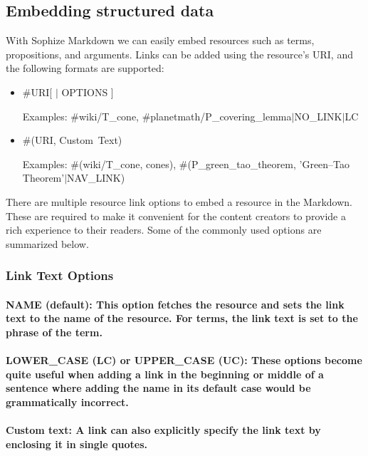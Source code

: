 \documentclass[a4paper]{article}
\begin{document}
\subsection{Embedding structured data}

With Sophize Markdown we can easily embed resources such as terms, propositions, and arguments. Links can be added using the resource's URI, and the following formats are supported:


\begin{itemize}

	\item \#URI[ $\vert$ OPTIONS ]

	Examples: \#wiki/T\_cone, \#planetmath/P\_covering\_lemma$\vert$NO\_LINK$\vert$LC

	\item \#(URI, \textquotesingle Custom\ Text)

	Examples: \#(wiki/T\_cone, \textquotesingle cones\textquotesingle), \#(P\_green\_tao\_theorem, 'Green–Tao Theorem'$\vert$NAV\_LINK)

\end{itemize}

There are multiple resource link options to embed a resource in the Markdown. These are required to make it convenient for the content creators to provide a rich experience to their readers. Some of the commonly used options are summarized below.

\subsubsection{Link Text Options}

\paragraph{\textbf{NAME} (default): This option fetches the resource and sets the link text to the name of the resource. For terms, the link text is set to the phrase of the term.}

\paragraph{\textbf{LOWER\_CASE (LC) or UPPER\_CASE (UC)}: These options become quite useful when adding a link in the beginning or middle of a sentence where adding the name in its default case would be grammatically incorrect.}

\paragraph{\textbf{Custom text}: A link can also explicitly specify the link text by enclosing it in single quotes.}
\end{document}
